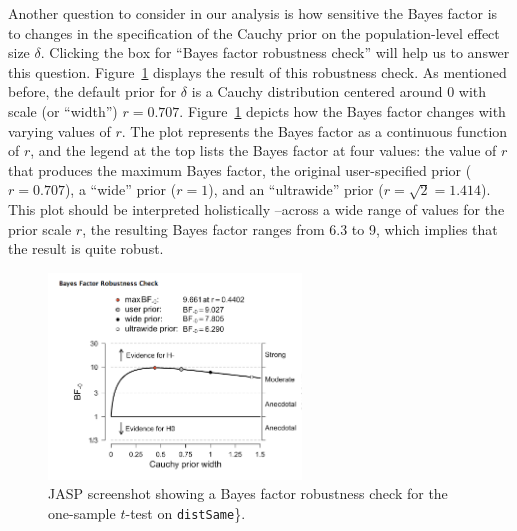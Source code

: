 \documentclass[english,,doc,floatsintext]{apa6}
\begin{document}
Another question to consider in our analysis is how sensitive the Bayes factor is to changes in the specification of the Cauchy prior on the population-level effect size \(\delta\). Clicking the box for \enquote{Bayes factor robustness check} will help us to answer this question. Figure~\ref{fig:ttestRobust} displays the result of this robustness check. As mentioned before, the default prior for \(\delta\) is a Cauchy distribution centered around \(0\) with scale (or \enquote{width}) \(r=0.707\). Figure~\ref{fig:ttestRobust} depicts how the Bayes factor changes with varying values of \(r\). The plot represents the Bayes factor as a continuous function of \(r\), and the legend at the top lists the Bayes factor at four values: the value of \(r\) that produces the maximum Bayes factor, the original user-specified prior (\(r=0.707\)), a \enquote{wide} prior (\(r=1\)), and an \enquote{ultrawide} prior (\(r=\sqrt{2}=1.414\)). This plot should be interpreted holistically --across a wide range of values for the prior scale \(r\), the resulting Bayes factor ranges from 6.3 to 9, which implies that the result is quite robust.

\begin{figure}[htbp]
\centering
\includegraphics[width=0.6\textwidth,height=\textheight]{figures/ttestRobust.png}
\caption{\label{fig:ttestRobust}JASP screenshot showing a Bayes factor robustness check for the one-sample \(t\)-test on \texttt{distSame}\}.}
\end{figure}
\end{document}
